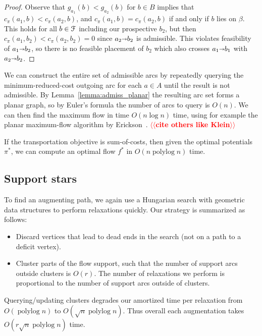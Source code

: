 \documentclass[a4paper,UKenglish]{socg-lipics-v2018}
\makeatletter
\def\note#1{\textcolor{red}{{#1}}}
\def\polylog{\mathop{\mathrm{polylog}}}
\def\arcto{\mathord\shortrightarrow}
\def\arc#1#2{#1\arcto#2}
\theoremstyle{plain}
\numberwithin{figure}{section}
\def\n@te#1{\textsf{\boldmath \textbf{$\langle\!\langle$#1$\rangle\!\rangle$}}\leavevmode}
\def\note#1{\textcolor{red}{\n@te{#1}}}
\makeatother
\begin{document}
\begin{toappendix}
\begin{proof}
Observe that $g_{a_1}(b) < g_{a_2}(b)$ for $b \in B$ implies that
$c_\pi(a_1, b) < c_\pi(a_2, b)$, and $c_\pi(a_1, b) = c_\pi(a_2, b)$ if and
only if $b$ lies on $\beta$.
This holds for all $b \in \EuScript{F}$ including our prospective $b_2$,
but then $c_\pi(a_1, b_2) < c_\pi(a_2, b_2) = 0$ since $\arc{a_2}{b_2}$ is
admissible.
This violates feasibility of $\arc{a_1}{b_2}$, so there is no feasible
placement of $b_2$ which also crosses $\arc{a_1}{b_1}$ with $\arc{a_2}{b_2}$.
\end{proof}

We can construct the entire set of admissible arcs by repeatedly querying
the minimum-reduced-cost outgoing arc for each $a \in A$ until the result is
not admissible.
By Lemma~\ref{lemma:admiss_planar} the resulting arc set forms a planar graph,
so by Euler's formula the number of arcs to query is $O(n)$.
We can then find the maximum flow in time $O(n\log n)$ time, using for example the
planar maximum-flow algorithm by Erickson~\cite{E10}. \note{cite others like Klein}

\begin{lemma}
If the transportation objective is sum-of-costs, then given the optimal
potentials $\pi^*$, we can compute an optimal flow $f^*$ in $O(n\polylog n)$
time.
\end{lemma}

\end{toappendix}


\subsection{Support stars}

To find an augmenting path, we again use a Hungarian search with geometric data
structures to perform relaxations quickly.
Our strategy is summarized as follows:
\begin{itemize}
\item Discard vertices that lead to dead ends in the search (not on a path
	to a deficit vertex).
\item Cluster parts of the flow support, such that the number of support arcs
	outside clusters is $O(r)$.
	The number of relaxations we perform is proportional to the number of
	support arcs outside of clusters.
\end{itemize}
Querying/updating clusters degrades our amortized time per relaxation from $O(\polylog n)$ to $O(\sqrt{n}\polylog n)$.
Thus overall each augmentation takes $O(r\sqrt{n}\polylog n)$ time.
\end{document}
